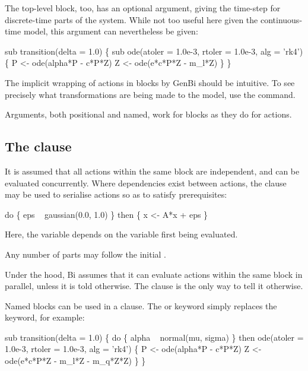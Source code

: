 The top-level  block, too, has an optional argument,
giving the time-step for discrete-time parts of the system. While not too
useful here given the continuous-time model, this argument can nevertheless be
given:
\begin{bicode}
sub transition(delta = 1.0) \{
  sub ode(atoler = 1.0e-3, rtoler = 1.0e-3, alg = 'rk4') \{
    P <- ode(alpha*P - c*P*Z)
    Z <- ode(e*c*P*Z - m_l*Z)
  \}
\}
\end{bicode}

\begin{tip}
The implicit wrapping of actions in blocks by GenBi should be intuitive. To
see precisely what transformations are being made to the model, use the
 command.
\end{tip}

Arguments, both positional and named, work for blocks as they do for actions.

\subsection{The  clause\label{do_then}}

It is assumed that all actions within the same block are independent, and can
be evaluated concurrently. Where dependencies exist between actions, the
 clause may be used to serialise actions so
as to satisfy prerequisites:
\begin{bicode}
do \{
  eps ~ gaussian(0.0, 1.0)
\} then \{
  x <- A*x + eps
\}
\end{bicode}
Here, the variable  depends on the variable  first being
evaluated.

Any number of  parts may follow the initial .

Under the hood, Bi assumes that it can evaluate actions within the same block
in parallel, unless it is told otherwise. The  clause is the
only way to tell it otherwise.

Named blocks can be used in a  clause. The  or
 keyword simply replaces the  keyword, for example:
\begin{bicode}
sub transition(delta = 1.0) \{
  do \{
    alpha ~ normal(mu, sigma)
  \} then ode(atoler = 1.0e-3, rtoler = 1.0e-3, alg = 'rk4') \{
    P <- ode(alpha*P - c*P*Z)
    Z <- ode(e*c*P*Z - m_l*Z - m_q*Z*Z)
  \}
\}
\end{bicode}

